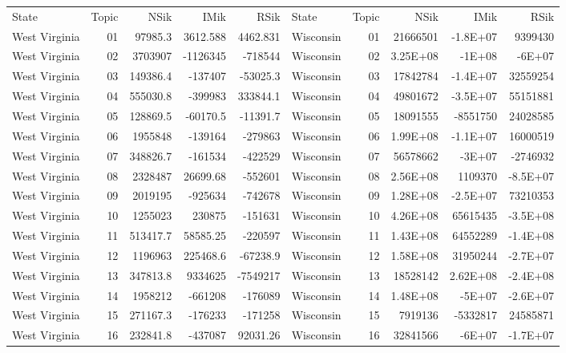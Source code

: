 \begin{table}[]
	\footnotesize
	\begin{tabular}{lrrrrlrrrr}
		State & Topic & NSik & IMik & RSik & State & Topic & NSik & IMik & RSik \\
		West Virginia &  01  & 97985.3 & 3612.588 & 4462.831 & Wisconsin &  01  & 21666501 & -1.8E+07 & 9399430 \\
		West Virginia &  02  & 3703907 & -1126345 & -718544 & Wisconsin &  02  & 3.25E+08 & -1E+08 & -6E+07 \\
		West Virginia &  03  & 149386.4 & -137407 & -53025.3 & Wisconsin &  03  & 17842784 & -1.4E+07 & 32559254 \\
		West Virginia &  04  & 555030.8 & -399983 & 333844.1 & Wisconsin &  04  & 49801672 & -3.5E+07 & 55151881 \\
		West Virginia &  05  & 128869.5 & -60170.5 & -11391.7 & Wisconsin &  05  & 18091555 & -8551750 & 24028585 \\
		West Virginia &  06  & 1955848 & -139164 & -279863 & Wisconsin &  06  & 1.99E+08 & -1.1E+07 & 16000519 \\
		West Virginia &  07  & 348826.7 & -161534 & -422529 & Wisconsin &  07  & 56578662 & -3E+07 & -2746932 \\
		West Virginia &  08  & 2328487 & 26699.68 & -552601 & Wisconsin &  08  & 2.56E+08 & 1109370 & -8.5E+07 \\
		West Virginia &  09  & 2019195 & -925634 & -742678 & Wisconsin &  09  & 1.28E+08 & -2.5E+07 & 73210353 \\
		West Virginia &  10 & 1255023 & 230875 & -151631 & Wisconsin &  10 & 4.26E+08 & 65615435 & -3.5E+08 \\
		West Virginia &  11 & 513417.7 & 58585.25 & -220597 & Wisconsin &  11 & 1.43E+08 & 64552289 & -1.4E+08 \\
		West Virginia &  12 & 1196963 & 225468.6 & -67238.9 & Wisconsin &  12 & 1.58E+08 & 31950244 & -2.7E+07 \\
		West Virginia &  13 & 347813.8 & 9334625 & -7549217 & Wisconsin &  13 & 18528142 & 2.62E+08 & -2.4E+08 \\
		West Virginia &  14 & 1958212 & -661208 & -176089 & Wisconsin &  14 & 1.48E+08 & -5E+07 & -2.6E+07 \\
		West Virginia &  15 & 271167.3 & -176233 & -171258 & Wisconsin &  15 & 7919136 & -5332817 & 24585871 \\
		West Virginia &  16 & 232841.8 & -437087 & 92031.26 & Wisconsin &  16 & 32841566 & -6E+07 & -1.7E+07 \\

\end{tabular}
\end{table}
